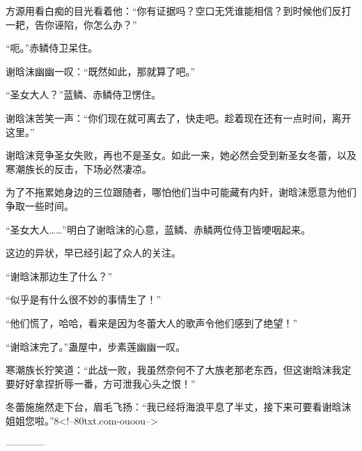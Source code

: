 \begin{this_body}
方源用看白痴的目光看着他：“你有证据吗？空口无凭谁能相信？到时候他们反打一耙，告你诬陷，你怎么办？”

“呃。”赤鳞侍卫呆住。

谢晗沫幽幽一叹：“既然如此，那就算了吧。”

“圣女大人？”蓝鳞、赤鳞侍卫愣住。

谢晗沫苦笑一声：“你们现在就可离去了，快走吧。趁着现在还有一点时间，离开这里。”

谢晗沫竞争圣女失败，再也不是圣女。如此一来，她必然会受到新圣女冬蕾，以及寒潮族长的反击，下场必然凄凉。

为了不拖累她身边的三位跟随者，哪怕他们当中可能藏有内奸，谢晗沫愿意为他们争取一些时间。

“圣女大人……”明白了谢晗沫的心意，蓝鳞、赤鳞两位侍卫皆哽咽起来。

这边的异状，早已经引起了众人的关注。

“谢晗沫那边生了什么？”

“似乎是有什么很不妙的事情生了！”

“他们慌了，哈哈，看来是因为冬蕾大人的歌声令他们感到了绝望！”

“谢晗沫完了。”蛊屋中，步素莲幽幽一叹。

寒潮族长狞笑道：“此战一败，我虽然奈何不了大族老那老东西，但这谢晗沫我定要好好拿捏折辱一番，方可泄我心头之恨！”

冬蕾施施然走下台，眉毛飞扬：“我已经将海浪平息了半丈，接下来可要看谢晗沫姐姐您啦。”8<!--80txt.com-ouoou-->

------------

\end{this_body}

